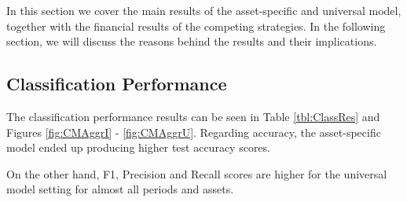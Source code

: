 \documentclass[11pt, a4paper]{article}
\begin{document}
In this section we cover the main results of the asset-specific and universal model, together with the financial results of the competing strategies. In the following section, we will discuss the reasons behind the results and their implications.

\subsection{Classification Performance}
\label{subsec:ER:ClassPerf}

The classification performance results can be seen in Table \ref{tbl:ClassRes} and Figures \ref{fig:CMAggrI} - \ref{fig:CMAggrU}.
Regarding accuracy, the asset-specific model ended up producing higher test accuracy scores. 

On the other hand, F1, Precision and Recall scores are higher for the universal model setting for almost all periods and assets.
\end{document}
